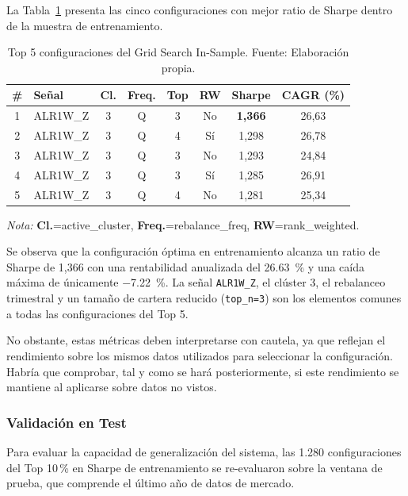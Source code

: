La Tabla~\ref{tab:top5_is} presenta las cinco configuraciones con
mejor ratio de Sharpe dentro de la muestra de entrenamiento.

\begin{table}[H]
\centering
\small
\begin{tabular}{clcccccc}
\toprule
\textbf{\#} & \textbf{Señal} & \textbf{Cl.} & \textbf{Freq.} & \textbf{Top} &
\textbf{RW} & \textbf{Sharpe} & \textbf{CAGR (\%)} \\
\midrule
1 & ALR1W\_Z  & 3 & Q & 3 & No  & \textbf{1,366} & 26,63 \\
2 & ALR1W\_Z  & 3 & Q & 4 & Sí  & 1,298         & 26,78 \\
3 & ALR1W\_Z  & 3 & Q & 3 & No  & 1,293         & 24,84 \\
4 & ALR1W\_Z  & 3 & Q & 3 & Sí  & 1,285         & 26,91 \\
5 & ALR1W\_Z  & 3 & Q & 4 & No  & 1,281         & 25,34 \\
\bottomrule
\end{tabular}
\caption{Top 5 configuraciones del Grid Search In-Sample.
Fuente: Elaboración propia.}
\label{tab:top5_is}
\begin{flushleft}
\small \textit{Nota:} \textbf{Cl.}=active\_cluster,
\textbf{Freq.}=rebalance\_freq, \textbf{RW}=rank\_weighted.
\end{flushleft}
\end{table}

Se observa que la configuración óptima en entrenamiento alcanza
un ratio de Sharpe de 1,366 con una rentabilidad anualizada del
\SI{26,63}{\percent} y una caída máxima de únicamente \SI{-7.22}{\percent}. La
señal \texttt{ALR1W\_Z}, el clúster 3, el rebalanceo trimestral
y un tamaño de cartera reducido (\texttt{top\_n=3}) son los
elementos comunes a todas las configuraciones del Top 5.

No obstante, estas métricas deben interpretarse con cautela, ya
que reflejan el rendimiento sobre los mismos datos utilizados
para seleccionar la configuración. Habría que comprobar, tal y como se hará posteriormente, si este
rendimiento se mantiene al aplicarse sobre datos no vistos.


\subsubsection{Validación en Test}

Para evaluar la capacidad de generalización del sistema, las
1.280 configuraciones del Top 10\,\% en Sharpe de entrenamiento
se re-evaluaron sobre la ventana de prueba, que comprende el
último año de datos de mercado. 

